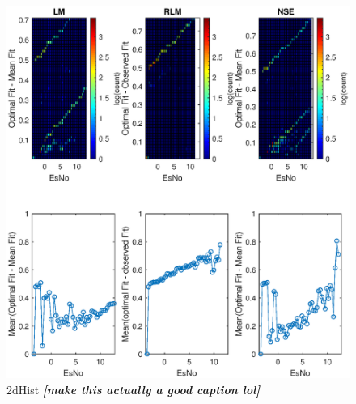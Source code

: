 \begin{figure}
\centering
\includegraphics[scale=0.8]{figures/c_sim_results/sim22_2dhist.eps}
\caption{2dHist \textit{\textbf{[make this actually a good caption lol]}}}
\label{fig:cSimBin2dHist}
\end{figure}

